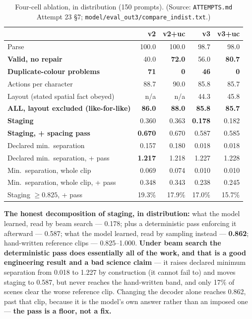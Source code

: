 \documentclass[11pt]{article}
\newcommand{\secsym}{\S}
\begin{document}
\begin{table}[h]
\centering
\footnotesize
\caption{Four-cell ablation, in distribution (150 prompts).
(Source: \texttt{ATTEMPTS.md} Attempt 23 \secsym7;
\texttt{model/eval\_out3/compare\_indist.txt}.)}
\label{tab:fourcellindist}
\begin{tabular}{@{}L{5cm}rrrr@{}}
\toprule
 & v2 & v2+uc & v3 & v3+uc \\
\midrule
Parse & 100.0 & 100.0 & 98.7 & 98.0 \\
\textbf{Valid, no repair} & 40.0 & \textbf{72.0} & 56.0 & \textbf{80.7} \\
\textbf{Duplicate-colour problems} & \textbf{71} & \textbf{0} & \textbf{46} & \textbf{0} \\
Actions per character & 88.7 & 90.0 & 85.8 & 85.7 \\
Layout (stated spatial fact obeyed) & n/a & n/a & 44.3 & 45.8 \\
\textbf{ALL, layout excluded (like-for-like)} & \textbf{86.0} & \textbf{88.0} & \textbf{85.8} & \textbf{85.7} \\
\textbf{Staging} & 0.360 & 0.363 & \textbf{0.178} & 0.182 \\
\textbf{Staging, + spacing pass} & \textbf{0.670} & 0.670 & 0.587 & 0.585 \\
Declared min.\ separation & 0.157 & 0.180 & 0.018 & 0.018 \\
Declared min.\ separation, + pass & \textbf{1.217} & 1.218 & 1.227 & 1.228 \\
Min.\ separation, whole clip & 0.069 & 0.074 & 0.010 & 0.010 \\
Min.\ separation, whole clip, + pass & 0.348 & 0.343 & 0.238 & 0.245 \\
Staging $\geq0.825$, + pass & 19.3\% & 17.9\% & 17.0\% & 15.7\% \\
\bottomrule
\end{tabular}
\end{table}

\textbf{The honest decomposition of staging, in distribution:} what the
model learned, read by beam search --- 0.178; plus a deterministic pass
enforcing it afterward --- 0.587; what the model learned, read by
sampling instead --- \textbf{0.862}; hand-written reference clips ---
0.825--1.000. \textbf{Under beam search the deterministic pass does
essentially all of the work, and that is a good engineering result and a
bad science claim} --- it raises declared minimum separation from 0.018
to 1.227 by construction (it cannot fail to) and moves staging to 0.587,
but never reaches the hand-written band, and only 17\% of scenes clear
the worse reference clip. Changing the decoder alone reaches 0.862, past
that clip, because it is the model's own answer rather than an imposed
one --- \textbf{the pass is a floor, not a fix.}
\end{document}
